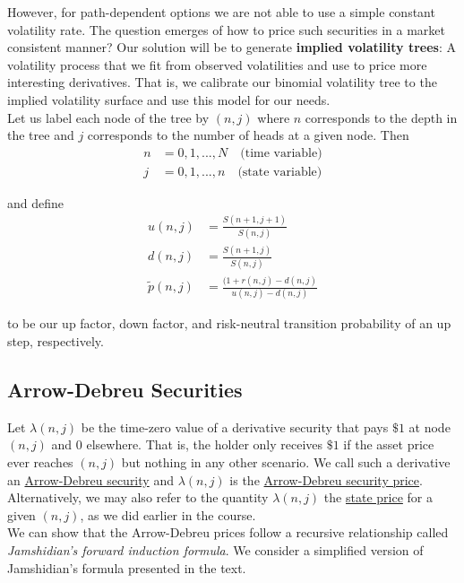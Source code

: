 \documentclass[12pt]{article}
\newlength\tindent
\renewcommand{\indent}{\hspace*{\tindent}}
\begin{document}
\indent However, for path-dependent options we are not able to use a simple constant volatility rate. The question emerges of how to price such securities in a market consistent manner? Our solution will be to generate {\bf implied volatility trees}: A volatility process that we fit from observed volatilities and use to price more interesting derivatives. That is, we calibrate our binomial volatility tree to the implied volatility surface and use this model for our needs. \\

\indent Let us label each node of the tree by $(n,j)$ where $n$ corresponds to the depth in the tree and $j$ corresponds to the number of heads at a given node. Then
\begin{align*}
	n &= 0,1,...,N \quad \text{(time variable)} \\
	j &= 0,1,...,n \quad \text{(state variable)}
\end{align*}

and define
\begin{align*}
	u(n,j) &= \frac{ S(n + 1, j + 1) }{ S(n,j) } \\
	d(n,j) &= \frac{ S(n + 1, j) }{ S(n,j) } \\
	\tilde{p}(n,j) &= \frac{ (1 + r(n,j) - d(n,j) }{ u(n,j) - d(n,j) }
\end{align*}

to be our up factor, down factor, and risk-neutral transition probability of an up step, respectively.

\subsection{Arrow-Debreu Securities}

\indent Let $\lambda(n,j)$ be the time-zero value of a derivative security that pays $\$1$ at node $(n,j)$ and 0 elsewhere. That is, the holder only receives $\$1$ if the asset price ever reaches $(n,j)$ but nothing in any other scenario. We call such a derivative an \underline{Arrow-Debreu security} and $\lambda(n,j)$ is the \underline{Arrow-Debreu security price}. Alternatively, we may also refer to the quantity $\lambda(n,j)$ the \underline{state price} for a given $(n,j)$, as we did earlier in the course. \\

\indent We can show that the Arrow-Debreu prices follow a recursive relationship called {\em Jamshidian's forward induction formula}. We consider a simplified version of Jamshidian's formula presented in the text. \\
\end{document}
